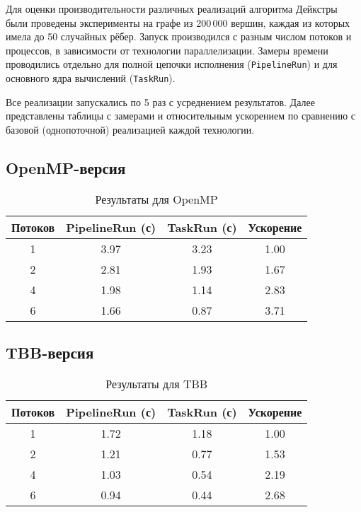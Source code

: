 \documentclass[12pt,a4paper]{extarticle}
\begin{document}
Для оценки производительности различных реализаций алгоритма Дейкстры были проведены
эксперименты на графе из 200\,000 вершин, каждая из которых имела до 50 случайных рёбер.
Запуск производился с разным числом потоков и процессов, в зависимости от технологии
параллелизации. Замеры времени проводились отдельно для полной цепочки исполнения
(\texttt{PipelineRun}) и для основного ядра вычислений (\texttt{TaskRun}).

Все реализации запускались по 5 раз с усреднением результатов. Далее представлены таблицы
с замерами и относительным ускорением по сравнению с базовой (однопоточной) реализацией
каждой технологии.

\subsection{OpenMP-версия}

\begin{table}[H]
\centering
\begin{tabular}{@{}cccc@{}}
\toprule
\textbf{Потоков} & \textbf{PipelineRun (с)} & \textbf{TaskRun (с)} & \textbf{Ускорение} \\ \midrule
1               & 3.97                     & 3.23                 & 1.00               \\
2               & 2.81                     & 1.93                 & 1.67               \\
4               & 1.98                     & 1.14                 & 2.83               \\
6               & 1.66                     & 0.87                 & 3.71               \\
\bottomrule
\end{tabular}
\caption{Результаты для OpenMP}
\end{table}

\subsection{TBB-версия}

\begin{table}[H]
\centering
\begin{tabular}{@{}cccc@{}}
\toprule
\textbf{Потоков} & \textbf{PipelineRun (с)} & \textbf{TaskRun (с)} & \textbf{Ускорение} \\ \midrule
1               & 1.72                     & 1.18                 & 1.00               \\
2               & 1.21                     & 0.77                 & 1.53               \\
4               & 1.03                     & 0.54                 & 2.19               \\
6               & 0.94                     & 0.44                 & 2.68               \\
\bottomrule
\end{tabular}
\caption{Результаты для TBB}
\end{table}
\end{document}
